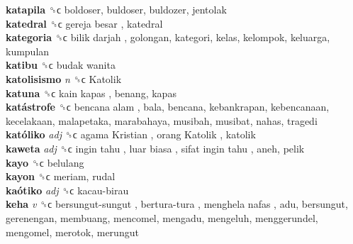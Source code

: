 \textbf{katapila} ␝ϲ  boldoser, buldoser, buldozer, jentolak  \\
\textbf{katedral} ␝ϲ   gereja besar , katedral  \\
\textbf{kategoria} ␝ϲ   bilik darjah , golongan, kategori, kelas, kelompok, keluarga, kumpulan  \\
\textbf{katibu} ␝ϲ   budak wanita   \\
\textbf{katolisismo} \emph{n}  ␝ϲ   Katolik   \\
\textbf{katuna} ␝ϲ   kain kapas , benang, kapas  \\
\textbf{katástrofe} ␝ϲ   bencana alam , bala, bencana, kebankrapan, kebencanaan, kecelakaan, malapetaka, marabahaya, musibah, musibat, nahas, tragedi  \\
\textbf{katóliko} \emph{adj}  ␝ϲ   agama Kristian ,  orang Katolik , katolik  \\
\textbf{kaweta} \emph{adj}  ␝ϲ   ingin tahu ,  luar biasa ,  sifat ingin tahu , aneh, pelik  \\
\textbf{kayo} ␝ϲ  belulang  \\
\textbf{kayon} ␝ϲ  meriam, rudal  \\
\textbf{kaótiko} \emph{adj}  ␝ϲ   kacau-birau   \\
\textbf{keha} \emph{v}  ␝ϲ   bersungut-sungut ,  bertura-tura ,  menghela nafas , adu, bersungut, gerenengan, membuang, mencomel, mengadu, mengeluh, menggerundel, mengomel, merotok, merungut  \\
